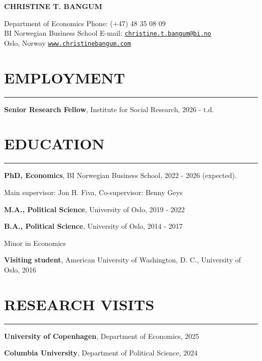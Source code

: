 \documentclass{article}
\newcommand{\cvsection}[1]{\section*{\normalfont#1} \vspace{-0.15cm}\hrule \hspace{1.6em}}
\begin{document}
\begin{center}
    \Huge{
    \rmfamily
    \textbf{CHRISTINE T. BANGUM}}
\end{center}
\vspace{20pt}


\setlength{\parskip}{1pt}
\renewcommand{\arraystretch}{1.25}


\noindent Department of Economics \hfill Phone: (+47) 48 35 08 09 \\
\noindent BI Norwegian Business School \hfill E-mail: \href{mailto:christine.t.bangum@bi.no} {\texttt{christine.t.bangum@bi.no}} \\
 Oslo, Norway \hfill \href{www.christinebangum.com}{\texttt{www.christinebangum.com}}

\setlength{\parskip}{3pt}

\cvsection{EMPLOYMENT}

\noindent
\hspace{0.4em}
\textbf{Senior Research Fellow}, Institute for Social Research, 2026 - t.d.


\cvsection{EDUCATION}

\noindent
\hspace{0.4em}
\textbf{PhD, Economics}, BI Norwegian Business School, 2022 - 2026 (expected).

Main supervisor: Jon H. Fiva, Co-supervisor: Benny Geys

\noindent
\hspace{0.4em}
\textbf{M.A., Political Science}, University of Oslo, 2019 - 2022

\noindent
\hspace{0.4em}
\textbf{B.A., Political Science}, University of Oslo, 2014 - 2017

Minor in Economics

\noindent
\hspace{0.4em}
\textbf{Visiting student}, American University of Washington, D. C., University of Oslo, 2016


\cvsection{RESEARCH VISITS}

\noindent
\hspace{0.4em}
\textbf{University of Copenhagen}, Department of Economics, 2025 

\noindent
\hspace{0.4em}
\textbf{Columbia University}, Department of Political Science, 2024
\end{document}
